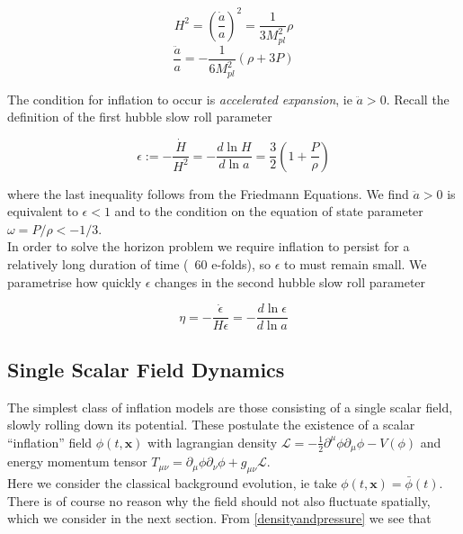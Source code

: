 \documentclass[a4paper,10pt]{article}
\renewcommand{\v}[1]{\mathbf{#1}}
\newcommand{\Mp}{M_{pl}}
\newcommand{\half}{\frac{1}{2}}
\newcommand{\bphi}{\bar{\phi}}
\begin{document}
\begin{equation}
H^2 = (\frac{\dot{a}}{a})^2 = \frac{1}{3\Mp^2}\rho
\tag{F1}
\label{F1}
\end{equation}
\begin{equation}
\frac{\ddot{a}}{a} = -\frac{1}{6\Mp^2}(\rho + 3P)
\tag{F2}
\label{F2}
\end{equation}

The condition for inflation to occur is \textit{accelerated expansion}, ie $\ddot{a} >0$. Recall the definition of the first hubble slow roll parameter 

\begin{equation}
\label{epsilon}
\epsilon := -\frac{\dot{H}}{H^2} = -\frac{d\ln{H}}{d\ln{a}} = \frac{3}{2}(1+\frac{P}{\rho})
\end{equation}

where the last inequality follows from the Friedmann Equations. We find $\ddot{a} >0$ is equivalent to $\epsilon<1$ and to the condition on the equation of state parameter $\omega=P/\rho < -1/3$.\\ 

In order to solve the horizon problem we require inflation to persist for a relatively long duration of time (~60 e-folds), so $\epsilon$ to must remain small. We parametrise how quickly $\epsilon$ changes in the second hubble slow roll parameter 

\begin{equation}
\eta = -\frac{\dot{\epsilon}}{H\epsilon} = -\frac{d\ln{\epsilon}}{d\ln{a}}
\end{equation}

\subsection{Single Scalar Field Dynamics}

The simplest class of inflation models are those consisting of a single scalar field, slowly rolling down its potential. These postulate the existence of a scalar ``inflation'' field $\phi(t,\v{x})$ with lagrangian density $\mathcal{L} = -\half \partial^\mu \phi \partial_\mu \phi - V(\phi)$ and energy momentum tensor $T_{\mu\nu}= \partial_\mu \phi \partial_\nu \phi + g_{\mu\nu}\mathcal{L}$. \\

Here we consider the classical background evolution, ie take $\phi(t,\v{x}) = \bphi(t)$. There is of course no reason why the field should not also fluctuate spatially, which we consider in the next section. From \ref{densityandpressure} we see that 
\end{document}
